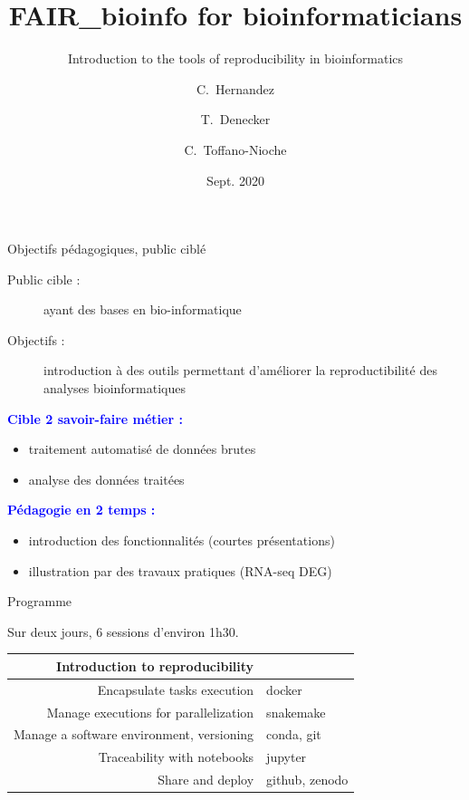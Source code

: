 \documentclass{beamer}
\title[FAIR{\_}Bioinfo] %
{FAIR{\_}bioinfo for bioinformaticians}
\subtitle{Introduction to the tools of reproducibility in bioinformatics}
\author[Céline, Claire] %
{C.~Hernandez\inst{1} \and T.~Denecker\inst{1} \and C.~Toffano-Nioche\inst{1}}
\institute[I2BC] %
{
  \inst{1}%
  Institute for Integrative Biology of the Cell (I2BC)\\
  UMR 9198, Université Paris-Sud, CNRS, CEA\\
  91190 - Gif-sur-Yvette, France
}
\date[IFB 2020] %
{Sept. 2020}
\begin{document}
 
\begin{frame}
    \titlepage
\end{frame}
\begin{frame}{Objectifs pédagogiques, public ciblé }
\begin{description}
  \item[Public cible :] ayant des bases en bio-informatique
  \item[Objectifs :] introduction à des outils permettant d'améliorer la reproductibilité des analyses bioinformatiques
\end{description}


{\bf \textcolor{blue}{Cible 2 savoir-faire métier :}}
\begin{itemize}
        \item traitement automatisé de données brutes
        \item analyse des données traitées
    \end{itemize} 
{\bf \textcolor{blue}{Pédagogie en 2 temps :}}
    \begin{itemize}
        \item introduction des fonctionnalités (courtes présentations)
        \item illustration par des travaux pratiques (RNA-seq DEG)
    \end{itemize}
\end{frame}
\begin{frame}{Programme}
\begin{center}
Sur deux jours, 6 sessions d'environ 1h30.
\end{center}
\begin{center}
\begin{tabular}{| r | l |}
\hline
    Introduction to reproducibility & \\
    \hline \hline
    Encapsulate tasks execution & docker\\
    \hline
    Manage executions for parallelization & snakemake\\ 
    \hline \hline
    Manage a software environment, versioning & conda, git \\
    \hline
    Traceability with notebooks & jupyter \\
    \hline \hline
    Share and deploy & github, zenodo \\
\hline
\end{tabular}
\end{center}
\end{frame}
\end{document}
